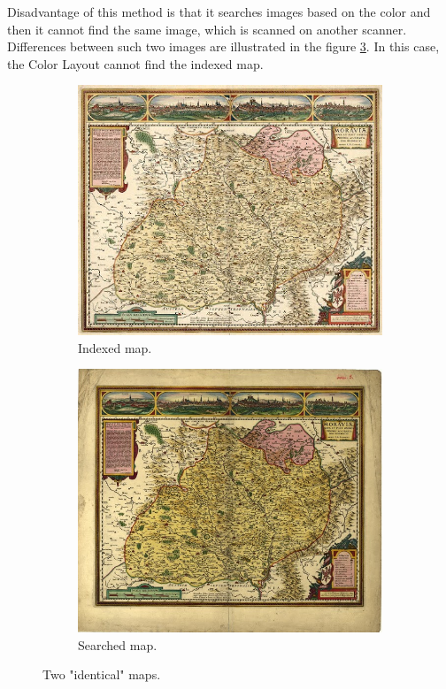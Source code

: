 \documentclass[12pt,a4paper]{report}
\begin{document}
Disadvantage of this method is that it searches images based on the color and then it cannot find the same image, which is scanned on another scanner. Differences between such two images are illustrated in the figure \ref{fig:identicalMaps}. In this case, the Color Layout cannot find the indexed map.

\begin{figure}[H]
  \centering
  \begin{subfigure}{0.5\textwidth}
    \centering
    \includegraphics[width=0.8\linewidth]{indexed_map.jpg}
    \caption{Indexed map.}
    \label{fig:indexedMap}
  \end{subfigure}%
  \begin{subfigure}{0.5\textwidth}
    \centering
    \includegraphics[width=0.8\linewidth]{searched_map.jpg}
    \caption{Searched map.}
    \label{fig:searchedMap}
  \end{subfigure}
\caption{Two "identical" maps.}
\label{fig:identicalMaps}
\end{figure}
\end{document}
